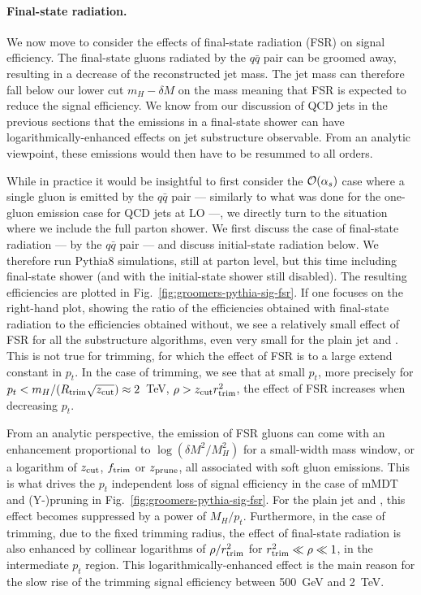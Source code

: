 \paragraph{Final-state radiation.}
%
We now move to consider the effects of final-state radiation (FSR) on
signal efficiency. The final-state gluons radiated by the $q\bar q$
pair can be groomed away, resulting in a
decrease of the reconstructed jet mass. The jet mass can therefore fall
below our lower cut $m_H-\delta M$ on the mass meaning that FSR is
expected to reduce the signal efficiency.
%
We know from our discussion of QCD jets in the previous sections that
the emissions in a final-state shower can have
logarithmically-enhanced effects on jet substructure observable. From
an analytic viewpoint, these emissions would then have to be resummed
to all orders.

While in practice it would be insightful to first consider the
${\cal {O}}(\alpha_s)$ case where a single gluon is emitted by the
$q\bar q$ pair --- similarly to what was done for the one-gluon
emission case for QCD jets at LO ---, we directly turn to the
situation where we include the full parton shower. We first discuss
the case of final-state radiation --- by the $q\bar q$ pair --- and
discuss initial-state radiation below.
%
We therefore run Pythia8 simulations, still at parton level, but this
time including final-state shower (and with the initial-state shower
still disabled).
%
The resulting efficiencies are plotted in
Fig.~\ref{fig:groomers-pythia-sig-fsr}.
%
If one focuses on the right-hand plot, showing the ratio of the
efficiencies obtained with final-state radiation to the efficiencies
obtained without, we see a relatively small effect of FSR for all the
substructure algorithms, even very small for the plain jet and \SD. This is not true for
trimming, for which the effect of FSR is to a large extend constant in $p_t$.
%
In the case of trimming, we see that at small $p_t$, more precisely
for $p_t<m_H/(R_\text{trim}\sqrt{z_{\text{cut}}})\approx 2$~TeV, \ie
$\rho>z_{\text{cut}}r_{\text{trim}}^2$, the effect of FSR increases when
decreasing $p_t$.

From an analytic perspective, the emission of FSR gluons can come with
an enhancement proportional to $\log(\delta M^2/M_H^2)$ for a
small-width mass window, or a logarithm of $z_{\text{cut}}$, $f_{\text{trim}}$ or
$z_{\text{prune}}$, all associated with soft gluon emissions. This is what
drives the $p_t$ independent loss of signal efficiency in the case of
mMDT and (Y-)pruning in Fig.~\ref{fig:groomers-pythia-sig-fsr}. For
the plain jet and \SD, this effect becomes suppressed by a power of
$M_H/p_t$.
%
Furthermore, in the case of trimming, due to the fixed trimming
radius, the effect of final-state radiation is also enhanced by
collinear logarithms of $\rho/r_{\text{trim}}^2$ for $r_{\text{trim}}^2\ll\rho\ll 1$,
\ie in the intermediate $p_t$ region. This logarithmically-enhanced
effect is the main reason for the slow rise of the trimming signal
efficiency between 500~GeV and 2~TeV.


